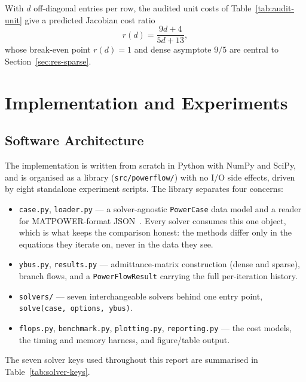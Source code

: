 \documentclass[sigconf,nonacm]{acmart}
\begin{document}
\noindent With $d$ off-diagonal entries per row, the audited unit costs of
Table~\ref{tab:audit-unit} give a predicted Jacobian cost ratio
\begin{equation}
r(d) = \frac{9d+4}{5d+13},
\label{eq:ratio-degree}
\end{equation}
whose break-even point $r(d)=1$ and dense asymptote $9/5$ are central to
Section~\ref{sec:res-sparse}.

\section{Implementation and Experiments}

\subsection{Software Architecture}
The implementation is written from scratch in Python with NumPy and SciPy, and
is organised as a library (\texttt{src/powerflow/}) with no I/O side effects,
driven by eight standalone experiment scripts. The library separates four
concerns:

\begin{itemize}
\item \texttt{case.py}, \texttt{loader.py} --- a solver-agnostic
      \texttt{PowerCase} data model and a reader for MATPOWER-format
      JSON~\cite{matpower}. Every solver consumes this one object, which is what
      keeps the comparison honest: the methods differ only in the equations they
      iterate on, never in the data they see.
\item \texttt{ybus.py}, \texttt{results.py} --- admittance-matrix construction
      (dense and sparse), branch flows, and a \texttt{PowerFlowResult} carrying
      the full per-iteration history.
\item \texttt{solvers/} --- seven interchangeable solvers behind one entry
      point, \texttt{solve(case, options, ybus)}.
\item \texttt{flops.py}, \texttt{benchmark.py}, \texttt{plotting.py},
      \texttt{reporting.py} --- the cost models, the timing and memory
      harness, and figure/table output.
\end{itemize}

\noindent The seven solver keys used throughout this report are summarised in
Table~\ref{tab:solver-keys}.
\end{document}
